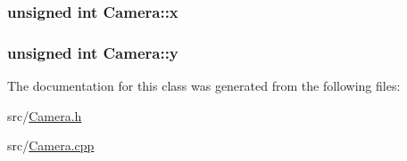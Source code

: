 \subsubsection[{\texorpdfstring{x}{x}}]{\setlength{\rightskip}{0pt plus 5cm}unsigned int Camera\+::x\hspace{0.3cm}{\ttfamily [protected]}}\hypertarget{classCamera_afd0591953df24bec6c110a1a9fc26de7}{}\label{classCamera_afd0591953df24bec6c110a1a9fc26de7}
\subsubsection[{\texorpdfstring{y}{y}}]{\setlength{\rightskip}{0pt plus 5cm}unsigned int Camera\+::y\hspace{0.3cm}{\ttfamily [protected]}}\hypertarget{classCamera_a532d3a4ec10ede7538b5aaba8ffaf2d9}{}\label{classCamera_a532d3a4ec10ede7538b5aaba8ffaf2d9}


The documentation for this class was generated from the following files\+:\begin{DoxyCompactItemize}
\item 
src/\hyperlink{Camera_8h}{Camera.\+h}\item 
src/\hyperlink{Camera_8cpp}{Camera.\+cpp}\end{DoxyCompactItemize}
